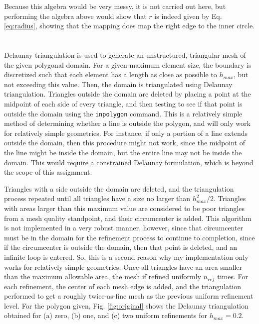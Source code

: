 \documentclass[10pt]{article}
\begin{document}
Because this algebra would be very messy, it is not carried out here, but performing the algebra above would show that \(r\) is indeed given by Eq. \eqref{eq:radius}, showing that the mapping does map the right edge to the inner circle.

\section{}

Delaunay triangulation is used to generate an unstructured, triangular mesh of the given polygonal domain. For a given maximum element size, the boundary is discretized such that each element has a length as close as possible to \(h_{max}\), but not exceeding this value. Then, the domain is triangulated using Delaunay triangulation. Triangles outside the domain are deleted by placing a point at the midpoint of each side of every triangle, and then testing to see if that point is outside the domain using the {\tt inpolygon} command. This is a relatively simple method of determining whether a line is outside the polygon, and will only work for relatively simple geometries. For instance, if only a portion of a line extends outside the domain, then this procedure might not work, since the midpoint of the line might be inside the domain, but the entire line may not be inside the domain. This would require a constrained Delaunay formulation, which is beyond the scope of this assignment. 

Triangles with a side outside the domain are deleted, and the triangulation process repeated until all triangles have a size no larger than \(h_{max}^2/2\). Triangles with areas larger than this maximum value are considered to be poor triangles from a mesh quality standpoint, and their circumcenter is added. This algorithm is not implemented in a very robust manner, however, since that circumcenter must be in the domain for the refinement process to continue to completion, since if the circumcenter is outside the domain, then that point is deleted, and an infinite loop is entered. So, this is a second reason why my implementation only works for relatively simple geometries. Once all triangles have an area smaller than the maximum allowable area, the mesh if refined uniformly \(n_{ref}\) times. For each refinement, the center of each mesh edge is added, and the triangulation performed to get a roughly twice-as-fine mesh as the previous uniform refinement level. For the polygon given, Fig. \ref{fig:original} shows the Delaunay triangulation obtained for (a) zero, (b) one, and (c) two uniform refinements for \(h_{max}=0.2\).
\end{document}
